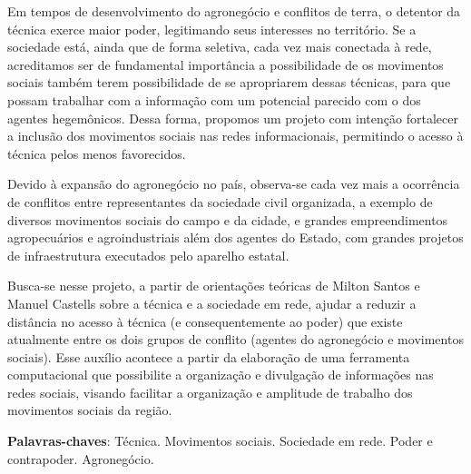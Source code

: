 \begin{resumoumacoluna}
Em tempos de desenvolvimento do agronegócio e conflitos de terra, o detentor da técnica exerce maior poder, legitimando seus interesses no território. Se a sociedade está, ainda que de forma seletiva, cada vez mais conectada à rede, acreditamos ser de fundamental importância a possibilidade de os movimentos sociais também terem possibilidade de se apropriarem dessas técnicas, para que possam trabalhar com a informação com um potencial parecido com o dos agentes hegemônicos. Dessa forma, propomos um projeto com intenção fortalecer a inclusão dos movimentos sociais nas redes informacionais, permitindo o acesso à técnica pelos menos favorecidos.

Devido à expansão do agronegócio no país, observa-se cada vez mais a ocorrência de  conflitos entre representantes da sociedade civil organizada, a exemplo de diversos movimentos sociais do campo e da cidade, e grandes empreendimentos agropecuários e agroindustriais além dos agentes do Estado, com  grandes projetos de infraestrutura executados pelo aparelho estatal.


Busca-se nesse projeto, a partir de orientações teóricas de Milton Santos e Manuel Castells sobre a técnica e a sociedade em rede, ajudar a reduzir a distância no acesso à técnica (e consequentemente ao poder) que existe atualmente entre os dois grupos de conflito (agentes do agronegócio e movimentos sociais). Esse auxílio acontece a partir da elaboração de uma ferramenta computacional que possibilite a organização e divulgação de informações nas redes sociais, visando facilitar a organização e amplitude de trabalho dos movimentos sociais da região.

 \vspace{\onelineskip}
 \noindent
 \textbf{Palavras-chaves}: Técnica. Movimentos sociais. Sociedade em rede. Poder e contrapoder. Agronegócio.
\end{resumoumacoluna}

